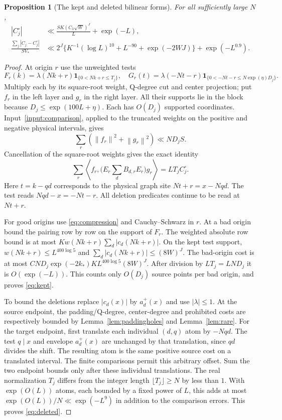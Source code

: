 \documentclass[11pt]{article}
\newtheorem{proposition}[theorem]{Proposition}
\theoremstyle{definition}
\newcommand{\ind}{\mathbf 1}
\newcommand{\norm}[1]{\left\lVert#1\right\rVert}
\begin{document}
\begin{proposition}[The kept and deleted bilinear forms]\label{prop:bilinear}
For all sufficiently large $N$,
\begin{align}
 |C_j^\circ|&\ll\frac{SK(C_3\sqrt W)^J}{L}+\exp(-L),
                                                 \label{eq:kept}\\
 \frac{\sum_j|C_j-C_j^\circ|}{SV_*}
 &\ll2^J\{K^{-1}(\log L)^{10}+L^{-90}+\exp(-2WJ)\}
          +\exp(-L^{0.9}).\label{eq:deleted}
\end{align}
\end{proposition}
\begin{proof}
At origin $r$ use the unweighted tests
\[
 F_r(k)=\lambda(Nk+r)\ind_{\{0<Nk+r\le T_j\}},\quad
 G_r(t)=\lambda(-Nt-r)\ind_{\{0<-Nt-r\le N\exp(\eta)D_j\}}.
\]
Multiply each by its square-root weight, Q-degree cut and center
projection; put $f_r$ in the left layer and $g_r$ in the right layer.
All their supports lie in the block because
$D_j\le\exp(100L+\eta)$.
Each has $O(D_j)$ supported coordinates.
Input~\ref{input:comparison}, applied to the truncated weights on the
positive and negative physical intervals, gives
\[
 \sum_r(\norm{f_r}^2+\norm{g_r}^2)\ll ND_jS.
\]
Cancellation of the square-root weights gives the exact identity
\begin{equation}\label{eq:pairing}
 \sum_r\left\langle f_r,
             \bigl(E_r\sum_dB_{d,r}E_r\bigr)g_r\right\rangle
       =LT_j C_j^\circ.
\end{equation}
Here $t=k-qd$ corresponds to the physical graph site
$Nt+r=x-Nqd$. The test reads $Nqd-x=-Nt-r$.
All deletion predicates continue to be read at $Nt+r$.

For good origins use \eqref{eq:compression} and Cauchy--Schwarz in $r$.
At a bad origin bound the pairing row by row on the support of $F_r$.
The weighted absolute row bound is at most
$K w(Nk+r)\sum_d|c_d(Nk+r)|$.
On the kept test support,
$w(Nk+r)\le L^{400\log5}$ and
$\sum_d|c_d(Nk+r)|\le(8W)^J$.
The bad-origin cost is at most
$CND_j\exp(-2k_*)K L^{400\log5}(8W)^J$.
After division by $LT_j=LND_j$ it is $O(\exp(-L))$.
This counts only $O(D_j)$ source points per bad origin, and proves
\eqref{eq:kept}.

To bound the deletions replace $|c_d(x)|$ by $a_d^+(x)$ and use
$|\lambda|\le1$. At the source endpoint, the padding/Q-degree,
center-degree and prohibited costs are respectively bounded by
Lemma~\ref{lem:paddingholes} and Lemma~\ref{lem:rare}.
For the target endpoint, first translate each individual $(d,q)$ atom
by $-Nqd$. The test $q\mid x$ and envelope $a_d^+(x)$ are unchanged
by that translation, since $qd$ divides the shift.
The resulting atom is the same positive source cost on a translated
interval. The finite comparisons permit this arbitrary offset.
Sum the two endpoint bounds only after these individual translations.
The real normalization $T_j$ differs from the integer length
$\lfloor T_j\rfloor\ge N$ by less than $1$. With $\exp(O(L))$ atoms,
each bounded by a fixed power of $L$, this adds at most
$\exp(O(L))/N\ll\exp(-L^9)$ in addition to the comparison errors.
This proves \eqref{eq:deleted}.
\end{proof}
\end{document}
